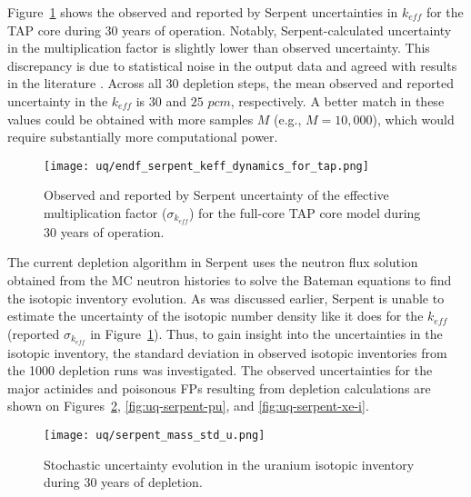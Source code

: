 Figure~\ref{fig:uq-serpent-keff-evolution} shows the observed and reported by 
Serpent uncertainties in $k_{eff}$ for the \gls{TAP} core during 30 years of 
operation. Notably, Serpent-calculated uncertainty in the multiplication 
factor is slightly lower than observed uncertainty. This discrepancy is due to 
statistical noise in the output data and agreed with results in the literature 
\cite{wyant_numerical_2012}. Across all 30 depletion steps, the mean observed 
and reported uncertainty in the $k_{eff}$ is $30$ and $25$ $pcm$, 
respectively. A better match in these values could be obtained with more 
samples $M$ (e.g., $M=10,\!000$), which would require substantially more 
computational power.
\begin{figure}[hbp!] %
	\centering
	\texttt{[image: uq/endf\_serpent\_keff\_dynamics\_for\_tap.png]}
	\caption{Observed and reported by Serpent uncertainty of the effective 
	multiplication factor ($\sigma_{k_{eff}}$) for the full-core \gls{TAP} 
	core model during 30 years of operation.}
	\label{fig:uq-serpent-keff-evolution}
\end{figure}

The current depletion algorithm in Serpent uses the neutron flux solution 
obtained from the \gls{MC} neutron histories to solve the Bateman equations to 
find the isotopic inventory evolution. As was discussed earlier, Serpent 
is unable to estimate the uncertainty of the isotopic number density like it 
does for the $k_{eff}$ (reported $\sigma_{k_{eff}}$ in 
Figure~\ref{fig:uq-serpent-keff-evolution}). Thus, to gain insight into the 
uncertainties in the isotopic inventory, the standard deviation in observed 
isotopic inventories from the 1000 depletion runs was investigated. The 
observed uncertainties for the major actinides and poisonous \glspl{FP} 
resulting from depletion calculations are shown on  
Figures~\ref{fig:uq-serpent-u}, \ref{fig:uq-serpent-pu}, and 
\ref{fig:uq-serpent-xe-i}.

\begin{figure}[htp!] %
	\centering
	\texttt{[image: uq/serpent\_mass\_std\_u.png]}
		\vspace{-4mm}
	\caption{Stochastic uncertainty evolution in the uranium isotopic 
	inventory during 30 years of depletion.}
	\label{fig:uq-serpent-u}
\end{figure}


